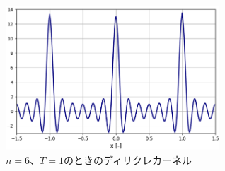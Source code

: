 \documentclass[dvipdfmx, 9pt, a4paper]{jsarticle}
\begin{document}
\begin{figure}[t]
\begin{center}
\includegraphics[width=8cm]{fig4.png}
\caption{$n=6$、$T=1$のときのディリクレカーネル}
\end{center}
\end{figure}
\end{document}
